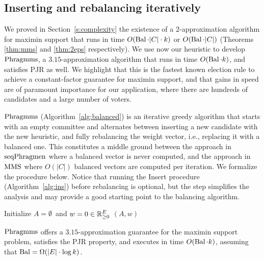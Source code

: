 \subsection{Inserting and rebalancing iteratively}\label{s:315}

We proved in Section~\ref{s:complexity} the existence of a 2-approximation algorithm for maximin support that runs in time $O(\operatorname{Bal}\cdot |C|\cdot k)$ or $O(\operatorname{Bal}\cdot |C|)$ (Theorems \ref{thm:mms} and \ref{thm:2eps} respectively). 
We use now our heuristic to develop $\phragmms$, a $3.15$-approximation algorithm that runs in time $O(\operatorname{Bal}\cdot k)$, and satisfies PJR as well. 
We highlight that this is the fastest known election rule to achieve a constant-factor guarantee for maximin support, and that gains in speed are of paramount importance for our application, where there are hundreds of candidates and a large number of voters.

$\phragmms$ (Algorithm~\ref{alg:balanced}) is an iterative greedy algorithm that starts with an empty committee and alternates between inserting a new candidate with the new heuristic, and fully rebalancing the weight vector, i.e., replacing it with a balanced one. This constitutes a middle ground between the approach in $\operatorname{seqPhragmen}$ where a balanced vector is never computed, and the approach in $\operatorname{MMS}$ where $O(|C|)$ balanced vectors are computed per iteration. 
We formalize the procedure below. Notice that running the Insert procedure (Algorithm~\ref{alg:ins}) before rebalancing is optional, but the step simplifies the analysis and may provide a good starting point to the balancing algorithm.

\begin{algorithm}[htb]
\SetAlgoLined
{}
Initialize $A=\emptyset$\ and $w=0\in\mathbb{R}_{\geq 0}^E$\;
\Return $(A,w)$\;
\caption{$\phragmms$}
\label{alg:balanced}
\end{algorithm}

\begin{theorem}\label{thm:315}
$\phragmms$ offers a $3.15$-approximation guarantee for the maximin support problem, satisfies the PJR property, and executes in time $O(\operatorname{Bal}\cdot k)$, assuming that $\operatorname{Bal}= \Omega(|E|\cdot \log k)$.
\end{theorem}

